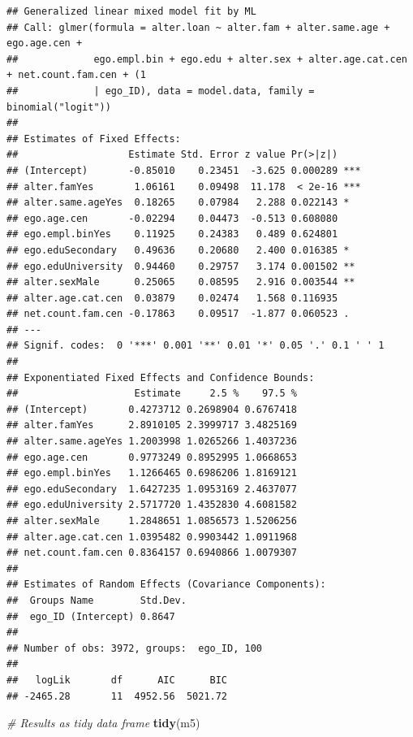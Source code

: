 \documentclass[
]{book}
\newenvironment{Shaded}{\begin{snugshade}}{\end{snugshade}}
\newcommand{\CommentTok}[1]{\textcolor[rgb]{0.56,0.35,0.01}{\textit{#1}}}
\newcommand{\FunctionTok}[1]{\textcolor[rgb]{0.13,0.29,0.53}{\textbf{#1}}}
\newcommand{\NormalTok}[1]{#1}
\begin{document}
\begin{verbatim}
## Generalized linear mixed model fit by ML
## Call: glmer(formula = alter.loan ~ alter.fam + alter.same.age + ego.age.cen +
##             ego.empl.bin + ego.edu + alter.sex + alter.age.cat.cen + net.count.fam.cen + (1
##             | ego_ID), data = model.data, family = binomial("logit"))
## 
## Estimates of Fixed Effects:
##                   Estimate Std. Error z value Pr(>|z|)    
## (Intercept)       -0.85010    0.23451  -3.625 0.000289 ***
## alter.famYes       1.06161    0.09498  11.178  < 2e-16 ***
## alter.same.ageYes  0.18265    0.07984   2.288 0.022143 *  
## ego.age.cen       -0.02294    0.04473  -0.513 0.608080    
## ego.empl.binYes    0.11925    0.24383   0.489 0.624801    
## ego.eduSecondary   0.49636    0.20680   2.400 0.016385 *  
## ego.eduUniversity  0.94460    0.29757   3.174 0.001502 ** 
## alter.sexMale      0.25065    0.08595   2.916 0.003544 ** 
## alter.age.cat.cen  0.03879    0.02474   1.568 0.116935    
## net.count.fam.cen -0.17863    0.09517  -1.877 0.060523 .  
## ---
## Signif. codes:  0 '***' 0.001 '**' 0.01 '*' 0.05 '.' 0.1 ' ' 1
## 
## Exponentiated Fixed Effects and Confidence Bounds:
##                    Estimate     2.5 %    97.5 %
## (Intercept)       0.4273712 0.2698904 0.6767418
## alter.famYes      2.8910105 2.3999717 3.4825169
## alter.same.ageYes 1.2003998 1.0265266 1.4037236
## ego.age.cen       0.9773249 0.8952995 1.0668653
## ego.empl.binYes   1.1266465 0.6986206 1.8169121
## ego.eduSecondary  1.6427235 1.0953169 2.4637077
## ego.eduUniversity 2.5717720 1.4352830 4.6081582
## alter.sexMale     1.2848651 1.0856573 1.5206256
## alter.age.cat.cen 1.0395482 0.9903442 1.0911968
## net.count.fam.cen 0.8364157 0.6940866 1.0079307
## 
## Estimates of Random Effects (Covariance Components):
##  Groups Name        Std.Dev.
##  ego_ID (Intercept) 0.8647  
## 
## Number of obs: 3972, groups:  ego_ID, 100
## 
##   logLik       df      AIC      BIC 
## -2465.28       11  4952.56  5021.72
\end{verbatim}

\begin{Shaded}
\begin{Highlighting}[]
\CommentTok{\# Results as tidy data frame}
\FunctionTok{tidy}\NormalTok{(m5)}
\end{Highlighting}
\end{Shaded}
\end{document}
